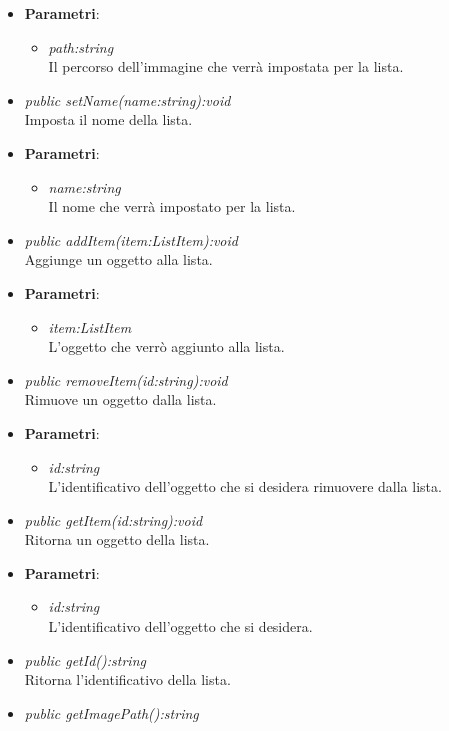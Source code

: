 \begin{itemize}
\begin{itemize}
				\item{\textbf{Parametri}: \begin{itemize}
				\item \textit{path:string}\\
				Il percorso dell'immagine che verrà impostata per la lista.
			\end{itemize}}
	\item \textit{public setName(name:string):void}\\
	Imposta il nome della lista.
				\item{\textbf{Parametri}: \begin{itemize}
				\item \textit{name:string}\\
				Il nome che verrà impostato per la lista.
			\end{itemize}}
	\item \textit{public addItem(item:ListItem):void}\\
	Aggiunge un oggetto alla lista.
				\item{\textbf{Parametri}: \begin{itemize}
				\item \textit{item:ListItem}\\
				L'oggetto che verrò aggiunto alla lista.
			\end{itemize}}
	\item \textit{public removeItem(id:string):void}\\
	Rimuove un oggetto dalla lista.
				\item{\textbf{Parametri}: \begin{itemize}
				\item \textit{id:string}\\
				L'identificativo dell'oggetto che si desidera rimuovere dalla lista.
			\end{itemize}}
	\item \textit{public getItem(id:string):void}\\
	Ritorna un oggetto della lista.
				\item{\textbf{Parametri}: \begin{itemize}
				\item \textit{id:string}\\
				L'identificativo dell'oggetto che si desidera.
			\end{itemize}}
	\item \textit{public getId():string}\\
	Ritorna l'identificativo della lista.
	\item \textit{public getImagePath():string}\\

\end{itemize}
\end{itemize}
